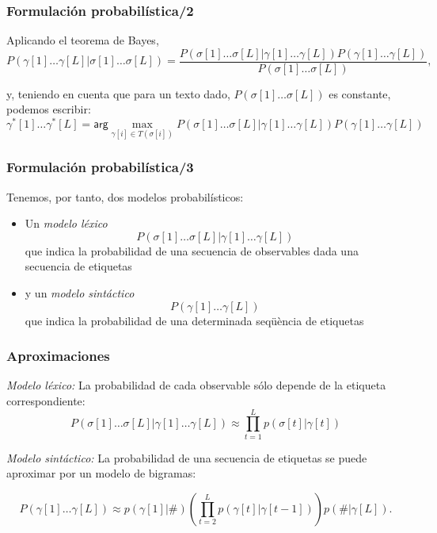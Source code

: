 \documentclass{beamer}
\begin{document}
\begin{frame}
\frametitle{ Formulación probabilística/2}

{
{Aplicando el teorema de Bayes,
{\small
\[
 P(\gamma[1]\ldots\gamma[L]|\sigma[1]\ldots\sigma[L])=
\frac{ P(\sigma[1]\ldots\sigma[L]|\gamma[1]\ldots\gamma[L])
 P(\gamma[1]\ldots\gamma[L])} {P(\sigma[1]\ldots\sigma[L])}
,\]
}
}

{y, teniendo en cuenta que para un texto dado,
  \(P(\sigma[1]\ldots\sigma[L])\) es constante, podemos escribir:
{\small
\[\gamma^*[1]\ldots\gamma^*[L]=\mathsf{arg}
 \max_{\gamma[i]\in T(\sigma[i])} P(\sigma[1]\ldots\sigma[L]|\gamma[1]\ldots\gamma[L])
 P(\gamma[1]\ldots\gamma[L])\]
}
}
}
\end{frame}
\begin{frame}
\frametitle{ Formulación probabilística/3}


Tenemos, por tanto, dos modelos probabilísticos:
\begin{itemize}
\item Un \emph{modelo léxico} 
\[ P(\sigma[1]\ldots\sigma[L]|\gamma[1]\ldots\gamma[L]) \]
que indica la probabilidad de una secuencia de observables dada una
secuencia de etiquetas

\item y un \emph{modelo sintáctico}
\[P(\gamma[1]\ldots\gamma[L])\]
que indica la probabilidad de una determinada seqüència de etiquetas
\end{itemize}


\end{frame}

\begin{frame}
\frametitle{ Aproximaciones}

{
{\emph{Modelo léxico:} La probabilidad de cada observable sólo depende de la etiqueta correspondiente:
\[P(\sigma[1]\ldots\sigma[L]|\gamma[1]\ldots\gamma[L])
\approx \prod_{t=1}^L p(\sigma[t]|\gamma[t]) \]
}
{\emph{Modelo sintáctico:} La probabilidad de una secuencia de etiquetas se puede aproximar por un modelo de bigramas:

\[P(\gamma[1]\ldots\gamma[L])\approx p(\gamma[1]|\#)\left(\prod_{t=2}^L
p(\gamma[t]|\gamma[t-1])\right) p(\#|\gamma[L]).\]}
}
\end{frame}

\end{document}
